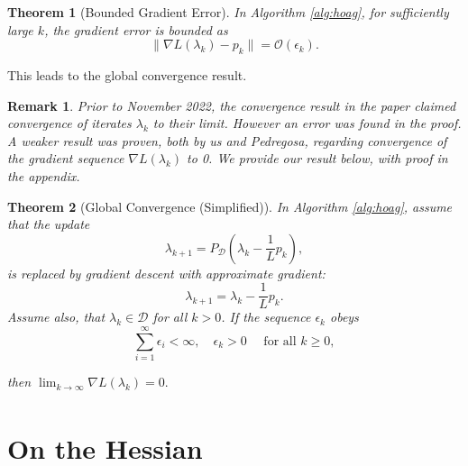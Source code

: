 \documentclass[11pt, twoside]{report}
\newtheorem{theorem}{Theorem}[section]
\newtheorem{remark}{Remark}[theorem]
\begin{document}
\begin{theorem}[Bounded Gradient Error] \label{thm_appgrad_hoag}
In Algorithm \ref{alg:hoag}, for sufficiently large $k$, the gradient error is bounded as
\[\|\nabla L(\lambda_k) - p_k\| = \mathcal{O}(\epsilon_k).\]
\end{theorem}

This leads to the global convergence result.

\begin{remark} \label{hoag_mistake}
    Prior to November 2022, the convergence result in the paper\cite{pedregosa2016hyperparameter} claimed convergence of iterates $\lambda_k$ to their limit. However an error was found in the proof. A weaker result was proven, both by us and Pedregosa, regarding convergence of the gradient sequence $\nabla L(\lambda_k)$ to 0. We provide our result below, with proof in the appendix.
\end{remark}

\begin{theorem}[Global Convergence (Simplified)] \label{hoag_thm_simplified}
In Algorithm \ref{alg:hoag}, assume that the update
\[\lambda_{k+1} = P_\mathcal{D} \left( \lambda_k - \frac{1}{L}p_k \right),\]
is replaced by gradient descent with approximate gradient:
\[\lambda_{k+1} = \lambda_k - \frac{1}{L}p_k.\]
Assume also, that $\lambda_k \in \mathcal{D}$ for all $k>0$. If the sequence $\epsilon_k$ obeys
\[\sum_{i=1}^\infty \epsilon_i < \infty, \quad \epsilon_k > 0 \quad \text{ for all } k \geq 0,\]

then $\lim_{k \xrightarrow[]{} \infty} \nabla L(\lambda_k) = 0.$
\end{theorem}

\section{On the Hessian}
\end{document}
